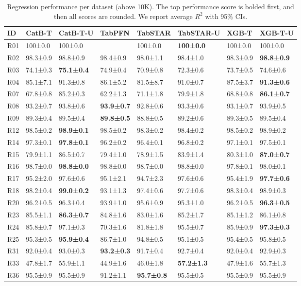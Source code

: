 \begin{table}
\center
\footnotesize
\caption{Regression performance per dataset (above 10K). The top performance score is bolded first, and then all scores are rounded. We report average $R^2$ with 95\% CIs.}
\label{tab:reg_unlimit_dataset_performance}
\begin{tabular}{llllllll}
\toprule
ID & CatB-T & CatB-T-U & TabPFN & TabSTAR & TabSTAR-U & XGB-T & XGB-T-U \\
\midrule
R01 & 100±0.0 & 100±0.0 &  & 100±0.0 & \textbf{100±0.0} & 100±0.0 & 100±0.0 \\
R02 & 98.3±0.9 & 98.8±0.9 & 98.4±0.9 & 98.0±1.1 & 98.4±1.0 & 98.3±0.9 & \textbf{98.8±0.9} \\
R03 & 74.1±0.3 & \textbf{75.1±0.4} & 74.9±0.4 & 70.9±0.8 & 72.3±0.6 & 73.7±0.5 & 74.6±0.6 \\
R04 & 85.1±7.1 & 91.3±0.8 & 86.1±5.2 & 81.5±8.7 & 91.0±0.7 & 87.5±3.7 & \textbf{91.3±0.6} \\
R07 & 67.8±0.8 & 85.2±0.3 & 62.2±1.3 & 71.1±1.8 & 79.9±1.8 & 68.8±0.8 & \textbf{86.1±0.7} \\
R08 & 93.2±0.7 & 93.8±0.6 & \textbf{93.9±0.7} & 92.8±0.6 & 93.3±0.6 & 93.1±0.7 & 93.9±0.5 \\
R09 & 89.3±0.4 & 89.5±0.4 & \textbf{89.8±0.5} & 88.8±0.5 & 89.2±0.6 & 89.3±0.5 & 89.5±0.4 \\
R12 & 98.5±0.2 & \textbf{98.9±0.1} & 98.5±0.2 & 98.3±0.2 & 98.4±0.2 & 98.5±0.2 & 98.9±0.2 \\
R14 & 97.3±0.1 & \textbf{97.8±0.1} & 96.2±0.2 & 96.4±0.1 & 96.8±0.2 & 97.1±0.1 & 97.5±0.1 \\
R15 & 79.9±1.1 & 86.5±0.7 & 79.4±1.0 & 78.9±1.5 & 83.9±1.4 & 80.3±1.0 & \textbf{87.0±0.7} \\
R16 & 98.7±0.0 & \textbf{98.8±0.0} & 98.8±0.0 & 98.7±0.0 & 98.8±0.0 & 97.8±0.1 & 98.0±0.1 \\
R17 & 95.2±2.0 & 97.6±0.6 & 95.1±2.1 & 94.7±2.3 & 97.6±0.6 & 95.4±1.9 & \textbf{97.7±0.6} \\
R18 & 98.2±0.4 & \textbf{99.0±0.2} & 93.1±1.3 & 97.4±0.6 & 97.7±0.6 & 98.3±0.4 & 98.9±0.3 \\
R20 & 96.2±0.5 & 96.3±0.4 & 93.9±1.0 & 95.6±0.9 & 95.3±1.0 & 96.2±0.5 & \textbf{96.3±0.5} \\
R23 & 85.5±1.1 & \textbf{86.3±0.7} & 84.8±1.6 & 83.0±1.6 & 85.2±1.7 & 85.1±1.2 & 86.1±0.8 \\
R24 & 85.8±0.7 & 97.1±0.3 & 70.3±1.6 & 81.8±1.8 & 95.5±0.7 & 85.9±0.9 & \textbf{97.3±0.3} \\
R25 & 95.3±0.5 & \textbf{95.9±0.4} & 86.7±1.0 & 94.8±0.5 & 95.1±0.5 & 95.4±0.5 & 95.8±0.5 \\
R31 & 92.0±0.4 & 93.0±0.3 & \textbf{93.2±0.3} & 91.7±0.4 & 92.7±0.4 & 92.0±0.4 & 92.9±0.3 \\
R33 & 47.8±1.7 & 55.9±1.1 & 44.9±1.6 & 46.0±1.8 & \textbf{57.2±1.3} & 47.9±1.6 & 55.7±1.3 \\
R36 & 95.5±0.9 & 95.5±0.9 & 91.2±1.1 & \textbf{95.7±0.8} & 95.5±0.5 & 95.5±0.9 & 95.5±0.9 \\
\bottomrule
\end{tabular}
\end{table}

